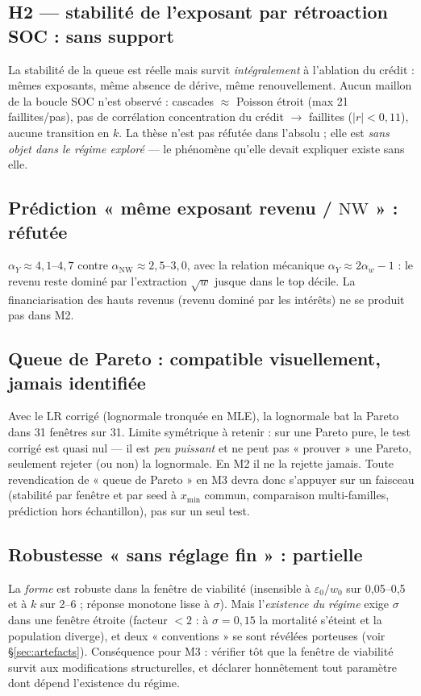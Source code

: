 \documentclass[11pt,a4paper]{article}
\newcommand{\NW}{\mathrm{NW}}
\begin{document}
\subsection{H2 --- stabilité de l'exposant par rétroaction SOC : sans support}
La stabilité de la queue est réelle mais survit \emph{intégralement} à
l'ablation du crédit : mêmes exposants, même absence de dérive, même
renouvellement. Aucun maillon de la boucle SOC n'est observé : cascades
$\approx$ Poisson étroit (max 21 faillites/pas), pas de corrélation
concentration du crédit $\to$ faillites ($|r| < 0{,}11$), aucune transition en
$k$. La thèse n'est pas réfutée dans l'absolu ; elle est \emph{sans objet dans
le régime exploré} --- le phénomène qu'elle devait expliquer existe sans elle.

\subsection{Prédiction « même exposant revenu / $\NW$ » : réfutée}
$\alpha_Y \approx 4{,}1$--$4{,}7$ contre $\alpha_{\NW} \approx 2{,}5$--$3{,}0$,
avec la relation mécanique $\alpha_Y \approx 2\alpha_w - 1$ : le revenu reste
dominé par l'extraction $\sqrt{w}$ jusque dans le top décile. La
financiarisation des hauts revenus (revenu dominé par les intérêts) ne se
produit pas dans M2.

\subsection{Queue de Pareto : compatible visuellement, jamais identifiée}
Avec le LR corrigé (lognormale tronquée en MLE), la lognormale bat la Pareto
dans 31 fenêtres sur 31. Limite symétrique à retenir : sur une Pareto pure, le
test corrigé est quasi nul --- il est \emph{peu puissant} et ne peut pas
« prouver » une Pareto, seulement rejeter (ou non) la lognormale. En M2 il ne
la rejette jamais. Toute revendication de « queue de Pareto » en M3 devra donc
s'appuyer sur un faisceau (stabilité par fenêtre et par seed à $x_{\min}$
commun, comparaison multi-familles, prédiction hors échantillon), pas sur un
seul test.

\subsection{Robustesse « sans réglage fin » : partielle}
La \emph{forme} est robuste dans la fenêtre de viabilité (insensible à
$\varepsilon_0/w_0$ sur 0,05--0,5 et à $k$ sur 2--6 ; réponse monotone lisse à
$\sigma$). Mais l'\emph{existence du régime} exige $\sigma$ dans une fenêtre
étroite (facteur $<2$ : à $\sigma=0{,}15$ la mortalité s'éteint et la
population diverge), et deux « conventions » se sont révélées porteuses (voir
§\ref{sec:artefacts}). Conséquence pour M3 : vérifier tôt que la fenêtre de
viabilité survit aux modifications structurelles, et déclarer honnêtement tout
paramètre dont dépend l'existence du régime.
\end{document}
